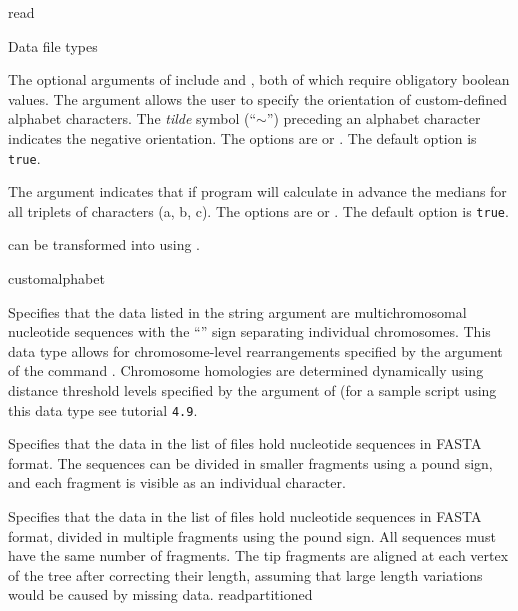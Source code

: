 \begin{command}{read}{}
\begin{arguments}
\begin{argumentgroup}{Data file types}
{	The optional arguments of  include 
	and , both of which require obligatory boolean values. The argument
	 allows the user to specify the orientation of custom-defined alphabet
	characters. The \emph{tilde} symbol (``$\sim$'') preceding an alphabet character indicates
	the negative orientation. The options are 
	or . The default option is \texttt{true}.
	
	The argument  indicates that if program will calculate in advance
	the medians for all triplets of characters (a, b, c). The options are  or
	. The default option is \texttt{true}.
	
	can be transformed into  using .}
	 {customalphabet}
        
            {Specifies that the data listed in the string argument are
            multichromosomal nucleotide sequences with the ``\atsymbol'' sign 
            separating individual chromosomes. This data type
            allows for chromosome-level rearrangements specified by
            the argument
             of the command
            . Chromosome
            homologies are determined dynamically using distance
            threshold levels specified by the argument
            of (for a sample script using this data type see tutorial \texttt{4.9}.} 
            {}
            
            {Specifies that the data in the list of files hold nucleotide
            sequences in FASTA format. The sequences can be divided in smaller
            fragments using a pound sign, and each fragment is visible as an
            individual character.} 
            {}

            {Specifies that the data in the list of files hold nucleotide
            sequences in FASTA format, divided in multiple fragments using the
            pound sign. All sequences must have the same number of fragments.
            The tip fragments are aligned at each vertex of the tree after
            correcting their length, assuming that large length variations would
            be caused by missing data.} 
            {readpartitioned}
            

\end{argumentgroup}
\end{arguments}
\end{command}
